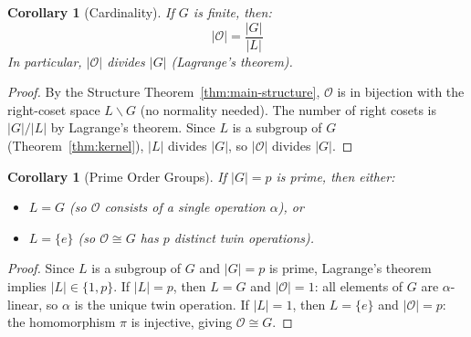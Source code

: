 \documentclass[11pt,a4paper,openany]{book}
\theoremstyle{plain}
\newtheorem{corollary}[theorem]{Corollary}
\theoremstyle{definition}
\newcommand{\opspace}{\mathcal{O}}
\newcommand{\lingroup}{L}
\newcommand{\groupG}{G}
\begin{document}
\begin{corollary}[Cardinality]\label{cor:cardinality}
If $\groupG$ is finite, then:
\[
|\opspace| = \frac{|\groupG|}{|\lingroup|}
\]
In particular, $|\opspace|$ divides $|\groupG|$ (Lagrange's theorem).
\end{corollary}

\begin{proof}
By the Structure Theorem~\ref{thm:main-structure}, $\opspace$ is in bijection with the right-coset space $\lingroup\backslash\groupG$ (no normality needed). The number of right cosets is $|\groupG|/|\lingroup|$ by Lagrange's theorem. Since $\lingroup$ is a subgroup of $\groupG$ (Theorem~\ref{thm:kernel}), $|\lingroup|$ divides $|\groupG|$, so $|\opspace|$ divides $|\groupG|$.
\end{proof}

\begin{corollary}[Prime Order Groups]\label{cor:prime-order}
If $|\groupG| = p$ is prime, then either:
\begin{itemize}
    \item $\lingroup = \groupG$ (so $\opspace$ consists of a single operation $\alpha$), or
    \item $\lingroup = \{e\}$ (so $\opspace \cong \groupG$ has $p$ distinct twin operations).
\end{itemize}
\end{corollary}

\begin{proof}
Since $\lingroup$ is a subgroup of $\groupG$ and $|\groupG| = p$ is prime, Lagrange's theorem implies $|\lingroup| \in \{1, p\}$. If $|\lingroup| = p$, then $\lingroup = \groupG$ and $|\opspace| = 1$: all elements of $\groupG$ are $\alpha$-linear, so $\alpha$ is the unique twin operation. If $|\lingroup| = 1$, then $\lingroup = \{e\}$ and $|\opspace| = p$: the homomorphism $\pi$ is injective, giving $\opspace \cong \groupG$.
\end{proof}
\end{document}
